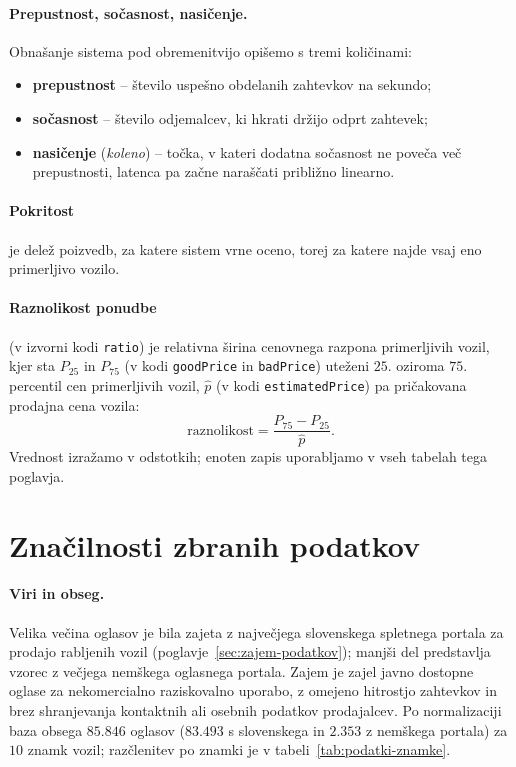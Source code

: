 \paragraph{Prepustnost, sočasnost, nasičenje.}
Obnašanje sistema pod obremenitvijo opišemo s tremi količinami:
\begin{itemize}
  \item \textbf{prepustnost} -- število uspešno obdelanih zahtevkov na
        sekundo;
  \item \textbf{sočasnost} -- število odjemalcev, ki hkrati držijo odprt
        zahtevek;
  \item \textbf{nasičenje} (\emph{koleno}) -- točka, v kateri dodatna
        sočasnost ne poveča več prepustnosti, latenca pa začne naraščati
        približno linearno.
\end{itemize}

\paragraph{Pokritost}
je delež poizvedb, za katere sistem vrne oceno, torej za
katere najde vsaj eno primerljivo vozilo.

\paragraph{Raznolikost ponudbe}
(v izvorni kodi \texttt{ratio}) je relativna širina
cenovnega razpona primerljivih vozil,
kjer sta $P_{25}$ in $P_{75}$ (v kodi \texttt{goodPrice} in \texttt{badPrice})
uteženi $25.$ oziroma $75.$ percentil cen primerljivih vozil, $\hat{p}$
(v kodi \texttt{estimatedPrice}) pa pričakovana prodajna cena vozila:
\begin{equation}
  \label{eq:raznolikost}
  \mathrm{raznolikost} = \frac{P_{75} - P_{25}}{\hat{p}}.
\end{equation}
Vrednost izražamo v odstotkih; enoten zapis uporabljamo v vseh tabelah tega poglavja.

\section{Značilnosti zbranih podatkov}
\label{sec:podatki}
\paragraph{Viri in obseg.}
Velika večina oglasov je bila zajeta z največjega slovenskega spletnega portala
za prodajo rabljenih vozil (poglavje~\ref{sec:zajem-podatkov}); manjši del
predstavlja vzorec z večjega nemškega oglasnega portala. Zajem je zajel
javno dostopne oglase za nekomercialno raziskovalno uporabo, z omejeno hitrostjo
zahtevkov in brez shranjevanja kontaktnih ali osebnih podatkov prodajalcev.
Po normalizaciji baza obsega $85.846$ oglasov ($83.493$ s slovenskega in
$2.353$ z nemškega portala) za $10$ znamk vozil; razčlenitev po znamki je v
tabeli~\ref{tab:podatki-znamke}.

